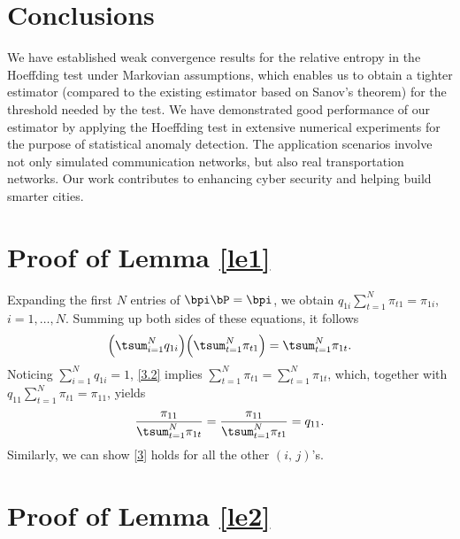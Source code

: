 \documentclass[10pt, twocolumn]{IEEEtran}
\begin{document}
\section{Conclusions} \label{sec:con}

We have established weak convergence results for the relative entropy in
the Hoeffding test under Markovian assumptions, which enables us to
obtain a {tighter} estimator (compared to the existing estimator based on
Sanov's theorem) for the threshold needed by the test. We have
demonstrated good performance of our estimator by applying the Hoeffding
test in extensive numerical experiments for the purpose of statistical
anomaly detection. The application scenarios involve not only simulated
communication networks, but also real transportation networks. Our work
contributes to enhancing cyber security and helping build smarter
cities.

\appendices
{}

\section{Proof of Lemma \ref{le1}} \label{sec:lem1}

Expanding the first $N$ entries of ${\bpi} \bP = {\bpi}$, we obtain
$q_{1i}\sum_{t = 1}^N {{\pi _{t1}}} = {\pi _{1i}}$, $i = 1,
\ldots, N$.  Summing up both sides of these equations, it follows
\begin{equation}
 \Big( \tsum_{i = 1}^N q_{1i}\Big) \Big( \tsum_{t = 1}^N \pi _{t1}\Big)
 = \tsum_{t = 1}^N \pi _{1t}.  \label{3.2} 
\end{equation}
Noticing $\sum_{i = 1}^N q_{1i} = 1$, \eqref{3.2} implies $\sum_{t =
  1}^N {{\pi _{t1}}} = \sum_{t = 1}^N {{\pi _{1t}}}$, which, together
with $q_{11}\sum_{t = 1}^N {{\pi _{t1}}} = {\pi _{11}}$, yields
\[
\frac{{{\pi _{11}}}}{{\tsum_{t = 1}^N {{\pi _{1t}}} }} = \frac{{{\pi
      _{11}}}}{{\tsum_{t = 1}^N {{\pi _{t1}}} }} = {q_{11}}.
\]
Similarly, we can show \eqref{3} holds for all the other $(i,\,j)$'s.



\section{Proof of Lemma \ref{le2}}  \label{sec:lem2}
\end{document}
